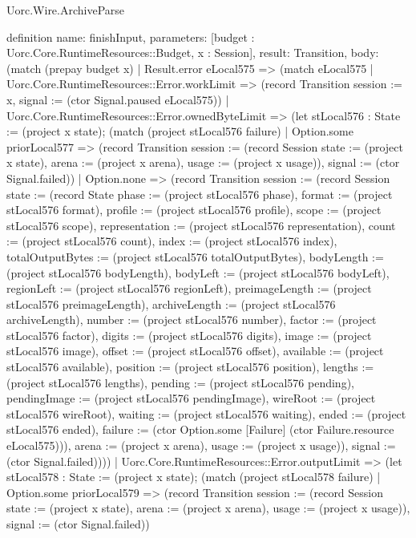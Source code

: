 \begin{lexlean}{Uorc.Wire.ArchiveParse}
\begin{semanticmodule}
definition{
  name: finishInput,
  parameters: [budget : Uorc.Core.RuntimeResources::Budget, x : Session],
  result: Transition,
  body: (match (prepay budget x)
    | Result.error eLocal575 => (match eLocal575
      | Uorc.Core.RuntimeResources::Error.workLimit => (record Transition {session := x, signal := (ctor Signal.paused eLocal575)})
      | Uorc.Core.RuntimeResources::Error.ownedByteLimit => (let stLocal576 : State := (project x state); (match (project stLocal576 failure)
        | Option.some priorLocal577 => (record Transition {session := (record Session {state := (project x state), arena := (project x arena), usage := (project x usage)}), signal := (ctor Signal.failed)})
        | Option.none => (record Transition {session := (record Session {state := (record State {phase := (project stLocal576 phase), format := (project stLocal576 format), profile := (project stLocal576 profile), scope := (project stLocal576 scope), representation := (project stLocal576 representation), count := (project stLocal576 count), index := (project stLocal576 index), totalOutputBytes := (project stLocal576 totalOutputBytes), bodyLength := (project stLocal576 bodyLength), bodyLeft := (project stLocal576 bodyLeft), regionLeft := (project stLocal576 regionLeft), preimageLength := (project stLocal576 preimageLength), archiveLength := (project stLocal576 archiveLength), number := (project stLocal576 number), factor := (project stLocal576 factor), digits := (project stLocal576 digits), image := (project stLocal576 image), offset := (project stLocal576 offset), available := (project stLocal576 available), position := (project stLocal576 position), lengths := (project stLocal576 lengths), pending := (project stLocal576 pending), pendingImage := (project stLocal576 pendingImage), wireRoot := (project stLocal576 wireRoot), waiting := (project stLocal576 waiting), ended := (project stLocal576 ended), failure := (ctor Option.some [Failure] (ctor Failure.resource eLocal575))}), arena := (project x arena), usage := (project x usage)}), signal := (ctor Signal.failed)})))
      | Uorc.Core.RuntimeResources::Error.outputLimit => (let stLocal578 : State := (project x state); (match (project stLocal578 failure)
        | Option.some priorLocal579 => (record Transition {session := (record Session {state := (project x state), arena := (project x arena), usage := (project x usage)}), signal := (ctor Signal.failed)})
}
\end{semanticmodule}
\end{lexlean}
